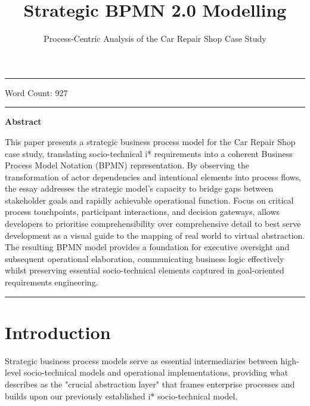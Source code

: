 \documentclass[14pt,a4paper]{article}
\title{Strategic BPMN 2.0 Modelling}
\author{Process-Centric Analysis of the Car Repair Shop Case Study}
\date{}
\begin{document}
\maketitle

\hrule

\vspace{3em}

Word Count: 927

\vspace{3em}
\hrule

\vspace{2em}
\textbf{Abstract}
\vspace{1em}

This paper presents a strategic business process model for the Car Repair Shop case study, translating socio-technical i* requirements into a coherent Business Process Model Notation (BPMN) representation. By observing the transformation of actor dependencies and intentional elements into process flows, the essay addresses the strategic model's capacity to bridge gaps between stakeholder goals and rapidly achievable operational function. Focus on critical process touchpoints, participant interactions, and decision gateways, allows developers to prioritise comprehensibility over comprehensive detail to best serve development as a visual guide to the mapping of real world to virtual abstraction. The resulting BPMN model provides a foundation for executive oversight and subsequent operational elaboration, communicating business logic effectively whilst preserving essential socio-technical elements captured in goal-oriented requirements engineering.

\vspace{3em}
\hrule

\thispagestyle{empty}

\tableofcontents
{}

\newpage


\section{Introduction}

Strategic business process models serve as essential intermediaries between high-level socio-technical models and operational implementations, providing what \textit{\parencite[p. 76]{Silver2011}} describes as the "crucial abstraction layer" that frames enterprise processes and builds upon our previously established i* socio-technical model.
\end{document}
